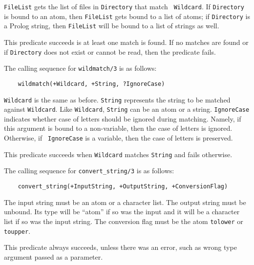 {\tt FileList} gets the list of files in {\tt Directory} that match {\tt
  Wildcard}.  If {\tt Directory} is bound to an atom, then {\tt FileList}
gets bound to a list of atoms; if {\tt Directory} is a Prolog string, then
{\tt FileList} will be bound to a list of strings as well.

This predicate succeeds is at least one match is found. If no matches are
found or if {\tt Directory} does not exist or cannot be read, then the
predicate fails.

The calling sequence for {\tt wildmatch/3}  is as follows:
\begin{verbatim}
    wildmatch(+Wildcard, +String, ?IgnoreCase)  
\end{verbatim}
{\tt Wildcard} is the same as before. {\tt String} represents the string to
be matched against {\tt Wildcard}. Like {\tt Wildcard}, {\tt String} can be
an atom or a string. {\tt IgnoreCase} indicates whether case of letters
should be ignored during matching. Namely, if this argument is bound to a
non-variable, then the case of letters is ignored. Otherwise, if {\tt
  IgnoreCase} is a variable, then the case of letters is preserved.

This predicate succeeds when {\tt Wildcard} matches {\tt String} and fails
otherwise.

The calling sequence for {\tt convert\_string/3}  is as follows:
\begin{verbatim}
    convert_string(+InputString, +OutputString, +ConversionFlag)  
\end{verbatim}
The input string must be an atom or a character list. The output string
must be unbound. Its type will be ``atom'' if so was the input and it will be
a character list if so was the input string. The conversion flag must be
the atom {\tt tolower} or {\tt toupper}. 

This predicate always succeeds, unless there was an error, such as wrong
type argument passed as a parameter.




